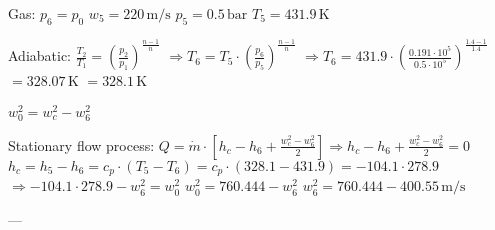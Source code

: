Gas:  
\( p_6 = p_0 \)  
\( w_5 = 220 \, \text{m/s} \)  
\( p_5 = 0.5 \, \text{bar} \)  
\( T_5 = 431.9 \, \text{K} \)  

Adiabatic:  
\( \frac{T_2}{T_1} = \left( \frac{p_2}{p_1} \right)^{\frac{n-1}{n}} \)  
\( \Rightarrow T_6 = T_5 \cdot \left( \frac{p_6}{p_5} \right)^{\frac{n-1}{n}} \)  
\( \Rightarrow T_6 = 431.9 \cdot \left( \frac{0.191 \cdot 10^5}{0.5 \cdot 10^5} \right)^{\frac{1.4-1}{1.4}} \)  
\( = 328.07 \, \text{K} \)  
\( = 328.1 \, \text{K} \)  

\( w_0^2 = w_c^2 - w_6^2 \)  

Stationary flow process:  
\( Q = \dot{m} \cdot \left[ h_c - h_6 + \frac{w_c^2 - w_6^2}{2} \right] \Rightarrow h_c - h_6 + \frac{w_c^2 - w_6^2}{2} = 0 \)  
\( h_c = h_5 - h_6 = c_p \cdot (T_5 - T_6) = c_p \cdot (328.1 - 431.9) = -104.1 \cdot 278.9 \)  
\( \Rightarrow -104.1 \cdot 278.9 - w_6^2 = w_0^2 \)  
\( w_0^2 = 760.444 - w_6^2 \)  
\( w_6^2 = 760.444 - 400.55 \, \text{m/s} \)  

---